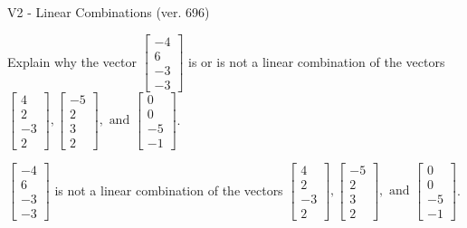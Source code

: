\begin{exercise}
  \begin{exerciseTitle}V2 - Linear Combinations (ver. 696)\end{exerciseTitle}
  \begin{exerciseStatement}
    Explain why the vector \(\left[\begin{array}{c}
-4 \\
6 \\
-3 \\
-3
\end{array}\right]\)  is or is not a linear 
	combination of the vectors \(\left[\begin{array}{c}
4 \\
2 \\
-3 \\
2
\end{array}\right] , \left[\begin{array}{c}
-5 \\
2 \\
3 \\
2
\end{array}\right] , \text{ and } \left[\begin{array}{c}
0 \\
0 \\
-5 \\
-1
\end{array}\right]\).
	


  \end{exerciseStatement}
  \begin{exerciseAnswer}
   \(\left[\begin{array}{c}
-4 \\
6 \\
-3 \\
-3
\end{array}\right]\) 
  	 is not  
	a linear combination of the vectors \(\left[\begin{array}{c}
4 \\
2 \\
-3 \\
2
\end{array}\right] , \left[\begin{array}{c}
-5 \\
2 \\
3 \\
2
\end{array}\right] , \text{ and } \left[\begin{array}{c}
0 \\
0 \\
-5 \\
-1
\end{array}\right]\).

	
  


  \end{exerciseAnswer}
\end{exercise}